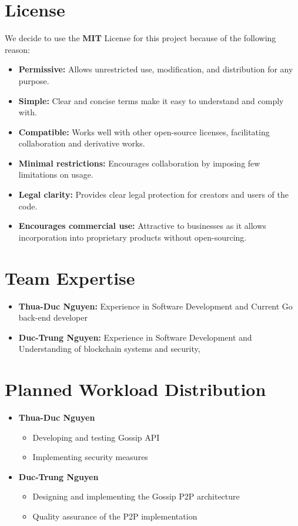 \section{License}
We decide to use the \textbf{MIT} License for this project because of the following reason:
\begin{itemize}
    \item \textbf{Permissive:} Allows unrestricted use, modification, and distribution for any purpose.
    \item \textbf{Simple:} Clear and concise terms make it easy to understand and comply with.
    \item \textbf{Compatible:} Works well with other open-source licenses, facilitating collaboration and derivative works.
    \item \textbf{Minimal restrictions:} Encourages collaboration by imposing few limitations on usage.
    \item \textbf{Legal clarity:} Provides clear legal protection for creators and users of the code.
    \item \textbf{Encourages commercial use:} Attractive to businesses as it allows incorporation into proprietary products without open-sourcing.
\end{itemize}

\section{Team Expertise}
\begin{itemize}
    \item \textbf{Thua-Duc Nguyen:} Experience in Software Development and Current Go back-end developer
    \item \textbf{Duc-Trung Nguyen:} Experience in Software Development and Understanding of blockchain systems and security,
\end{itemize}

\section{Planned Workload Distribution}
\begin{itemize}
    \item \textbf{Thua-Duc Nguyen}
    \begin{itemize}
        \item Developing and testing Gossip API
        \item Implementing security measures
    \end{itemize}
    \item \textbf{Duc-Trung Nguyen}
    \begin{itemize}
        \item Designing and implementing the Gossip P2P architecture
        \item Quality assurance of the P2P implementation
    \end{itemize}
\end{itemize}
